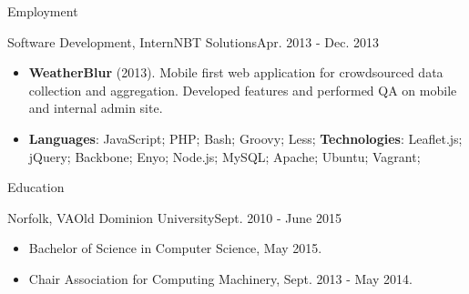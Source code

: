 \documentclass[]{mcdowellcv}
\begin{document}
\begin{cvsection}{Employment}
        \begin{cvsubsection}{Software Development, Intern}{NBT Solutions}{Apr. 2013 - Dec. 2013}
            \begin{itemize}
                \item \textbf{WeatherBlur} (2013). Mobile first web application for crowdsourced data collection and aggregation. Developed features and performed QA on mobile and internal admin site.
            \end{itemize}
            \begin{itemize}
                 \item \textbf{Languages}:  JavaScript; PHP;  Bash; Groovy; Less;\newline
                \textbf{Technologies}: Leaflet.js; jQuery; Backbone; Enyo; Node.js; MySQL; Apache; Ubuntu; Vagrant;
            \end{itemize}
        \end{cvsubsection}

    \end{cvsection}

    \begin{cvsection}{Education}
        \begin{cvsubsection}{Norfolk, VA}{Old Dominion University}{Sept. 2010 - June 2015}
            \begin{itemize}
                \item  Bachelor of Science in Computer Science, May 2015.
                \item Chair Association for Computing Machinery, Sept. 2013 - May 2014.
            \end{itemize}
        \end{cvsubsection}
    \end{cvsection}
\end{document}
